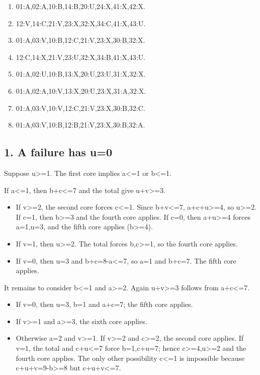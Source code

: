 \documentclass[
  10pt,
]{article}
\providecommand{\tightlist}{%
  \setlength{\itemsep}{0pt}\setlength{\parskip}{0pt}}
\begin{document}
\begin{enumerate}
\def\labelenumi{\arabic{enumi}.}
\tightlist
\item
  01:A,02:A,10:B,14:B,20:U,24:X,41:X,42:X.
\item
  12:V,14:C,21:V,23:X,32:X,34:C,41:X,43:U.
\item
  01:A,03:V,10:B,12:C,21:V,23:X,30:B,32:X.
\item
  12:C,14:X,21:V,23:U,32:X,34:B,41:X,43:U.
\item
  01:A,02:U,10:B,13:X,20:U,23:U,31:X,32:X.
\item
  01:A,02:A,10:V,13:X,20:U,23:X,31:A,32:X.
\item
  01:A,03:V,10:V,12:C,21:V,23:X,30:B,32:C.
\item
  01:A,03:V,10:B,12:B,21:V,23:X,30:B,32:A.
\end{enumerate}

\hypertarget{a-failure-has-u0}{%
\subsection*{1. A failure has u=0}\label{a-failure-has-u0}}

Suppose u\textgreater=1. The first core implies a\textless=1 or
b\textless=1.

If a\textless=1, then b+c\textless=7 and the total give
u+v\textgreater=3.

\begin{itemize}
\tightlist
\item
  If v\textgreater=2, the second core forces c\textless=1. Since
  b+v\textless=7, a+c+u\textgreater=4, so u\textgreater=2. If c=1, then
  b\textgreater=3 and the fourth core applies. If c=0, then
  a+u\textgreater=4 forces a=1,u=3, and the fifth core applies
  (b\textgreater=4).
\item
  If v=1, then u\textgreater=2. The total forces b,c\textgreater=1, so
  the fourth core applies.
\item
  If v=0, then u=3 and b+c=8-a\textless=7, so a=1 and b+c=7. The fifth
  core applies.
\end{itemize}

It remains to consider b\textless=1 and a\textgreater=2. Again
u+v\textgreater=3 follows from a+c\textless=7.

\begin{itemize}
\tightlist
\item
  If v=0, then u=3, b=1 and a+c=7; the fifth core applies.
\item
  If v\textgreater=1 and a\textgreater=3, the sixth core applies.
\item
  Otherwise a=2 and v\textgreater=1. If v\textgreater=2 and
  c\textgreater=2, the second core applies. If v=1, the total and
  c+u\textless=7 force b=1,c+u=7; hence c\textgreater=4,u\textgreater=2
  and the fourth core applies. The only other possibility c\textless=1
  is impossible because c+u+v=9-b\textgreater=8 but c+u+v\textless=7.
\end{itemize}
\end{document}
